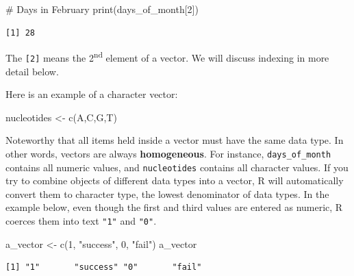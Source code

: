 \documentclass[
  letterpaper,
  DIV=11,
  numbers=noendperiod]{scrreprt}
\newenvironment{Shaded}{\begin{snugshade}}{\end{snugshade}}
\newcommand{\CommentTok}[1]{\textcolor[rgb]{0.37,0.37,0.37}{#1}}
\newcommand{\DecValTok}[1]{\textcolor[rgb]{0.68,0.00,0.00}{#1}}
\newcommand{\FunctionTok}[1]{\textcolor[rgb]{0.28,0.35,0.67}{#1}}
\newcommand{\NormalTok}[1]{\textcolor[rgb]{0.00,0.23,0.31}{#1}}
\newcommand{\OtherTok}[1]{\textcolor[rgb]{0.00,0.23,0.31}{#1}}
\newcommand{\StringTok}[1]{\textcolor[rgb]{0.13,0.47,0.30}{#1}}
\begin{document}
\begin{Shaded}
\begin{Highlighting}[]
\CommentTok{\# Days in February}
\FunctionTok{print}\NormalTok{(days\_of\_month[}\DecValTok{2}\NormalTok{])}
\end{Highlighting}
\end{Shaded}

\begin{verbatim}
[1] 28
\end{verbatim}

The \texttt{{[}2{]}} means the 2\textsuperscript{nd} element of a
vector. We will discuss indexing in more detail below.

Here is an example of a character vector:

\begin{Shaded}
\begin{Highlighting}[]
\NormalTok{nucleotides }\OtherTok{\textless{}{-}} \FunctionTok{c}\NormalTok{(}\StringTok{\textquotesingle{}A\textquotesingle{}}\NormalTok{,}\StringTok{\textquotesingle{}C\textquotesingle{}}\NormalTok{,}\StringTok{\textquotesingle{}G\textquotesingle{}}\NormalTok{,}\StringTok{\textquotesingle{}T\textquotesingle{}}\NormalTok{)}
\end{Highlighting}
\end{Shaded}

Noteworthy that all items held inside a vector must have the same data
type. In other words, vectors are always \textbf{homogeneous}. For
instance, \texttt{days\_of\_month} contains all numeric values, and
\texttt{nucleotides} contains all character values. If you try to
combine objects of different data types into a vector, R will
automatically convert them to character type, the lowest denominator of
data types. In the example below, even though the first and third values
are entered as numeric, R coerces them into text \texttt{"1"} and
\texttt{"0"}.

\begin{Shaded}
\begin{Highlighting}[]
\NormalTok{a\_vector }\OtherTok{\textless{}{-}} \FunctionTok{c}\NormalTok{(}\DecValTok{1}\NormalTok{, }\StringTok{"success"}\NormalTok{, }\DecValTok{0}\NormalTok{, }\StringTok{"fail"}\NormalTok{)}
\NormalTok{a\_vector}
\end{Highlighting}
\end{Shaded}

\begin{verbatim}
[1] "1"       "success" "0"       "fail"   
\end{verbatim}
\end{document}
